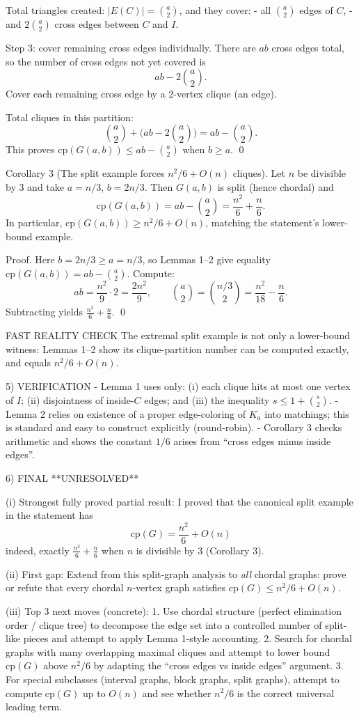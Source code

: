 Total triangles created: $|E(C)|=\binom{a}{2}$, and they cover:
- all $\binom{a}{2}$ edges of $C$,
- and $2\binom{a}{2}$ cross edges between $C$ and $I$.

Step 3: cover remaining cross edges individually.
There are $ab$ cross edges total, so the number of cross edges not yet covered is
\[ab-2\binom{a}{2}.\]
Cover each remaining cross edge by a 2-vertex clique (an edge).

Total cliques in this partition:
\[\binom{a}{2} + \big(ab-2\binom{a}{2}\big)=ab-\binom{a}{2}.\]
This proves $\mathrm{cp}(G(a,b))\le ab-\binom{a}{2}$ when $b\ge a$. \qed

Corollary 3 (The split example forces $n^2/6+O(n)$ cliques).
Let $n$ be divisible by $3$ and take $a=n/3$, $b=2n/3$. Then $G(a,b)$ is split (hence chordal) and
\[\mathrm{cp}(G(a,b)) = ab-\binom{a}{2} = \frac{n^2}{6}+\frac{n}{6}.\]
In particular, $\mathrm{cp}(G(a,b))\ge n^2/6+O(n)$, matching the statement's lower-bound example.

Proof.
Here $b=2n/3\ge a=n/3$, so Lemmas 1--2 give equality $\mathrm{cp}(G(a,b))=ab-\binom{a}{2}$.
Compute:
\[ab=\frac{n^2}{9}\cdot 2=\frac{2n^2}{9},\qquad \binom{a}{2}=\binom{n/3}{2}=\frac{n^2}{18}-\frac{n}{6}.\]
Subtracting yields $\frac{n^2}{6}+\frac{n}{6}$. \qed

FAST REALITY CHECK
The extremal split example is not only a lower-bound witness: Lemmas 1--2 show its clique-partition number can be computed exactly, and equals $n^2/6+O(n)$.

5) VERIFICATION
- Lemma 1 uses only: (i) each clique hits at most one vertex of $I$; (ii) disjointness of inside-$C$ edges; and (iii) the inequality $s\le 1+\binom{s}{2}$.
- Lemma 2 relies on existence of a proper edge-coloring of $K_a$ into matchings; this is standard and easy to construct explicitly (round-robin).
- Corollary 3 checks arithmetic and shows the constant $1/6$ arises from ``cross edges minus inside edges''.

6) FINAL
**UNRESOLVED**

(i) Strongest fully proved partial result:
I proved that the canonical split example in the statement has
\[\mathrm{cp}(G)=\frac{n^2}{6}+O(n)\]
indeed, exactly $\frac{n^2}{6}+\frac{n}{6}$ when $n$ is divisible by $3$ (Corollary 3).

(ii) First gap:
Extend from this split-graph analysis to \emph{all} chordal graphs: prove or refute that every chordal $n$-vertex graph satisfies
$\mathrm{cp}(G)\le n^2/6+O(n)$.

(iii) Top 3 next moves (concrete):
1. Use chordal structure (perfect elimination order / clique tree) to decompose the edge set into a controlled number of split-like pieces and attempt to apply Lemma 1-style accounting.
2. Search for chordal graphs with many overlapping maximal cliques and attempt to lower bound $\mathrm{cp}(G)$ above $n^2/6$ by adapting the ``cross edges vs inside edges'' argument.
3. For special subclasses (interval graphs, block graphs, split graphs), attempt to compute $\mathrm{cp}(G)$ up to $O(n)$ and see whether $n^2/6$ is the correct universal leading term.

